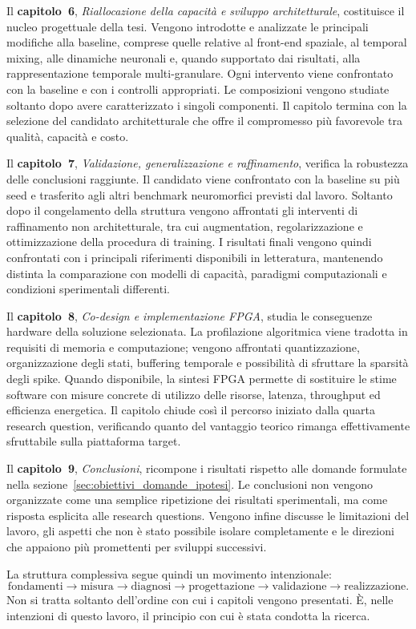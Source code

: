 Il \textbf{capitolo~6}, \emph{Riallocazione della capacità e sviluppo architetturale}, costituisce il nucleo progettuale della tesi. Vengono introdotte e analizzate le principali modifiche alla baseline, comprese quelle relative al front-end spaziale, al temporal mixing, alle dinamiche neuronali e, quando supportato dai risultati, alla rappresentazione temporale multi-granulare. Ogni intervento viene confrontato con la baseline e con i controlli appropriati. Le composizioni vengono studiate soltanto dopo avere caratterizzato i singoli componenti. Il capitolo termina con la selezione del candidato architetturale che offre il compromesso più favorevole tra qualità, capacità e costo.

Il \textbf{capitolo~7}, \emph{Validazione, generalizzazione e raffinamento}, verifica la robustezza delle conclusioni raggiunte. Il candidato viene confrontato con la baseline su più seed e trasferito agli altri benchmark neuromorfici previsti dal lavoro. Soltanto dopo il congelamento della struttura vengono affrontati gli interventi di raffinamento non architetturale, tra cui augmentation, regolarizzazione e ottimizzazione della procedura di training. I risultati finali vengono quindi confrontati con i principali riferimenti disponibili in letteratura, mantenendo distinta la comparazione con modelli di capacità, paradigmi computazionali e condizioni sperimentali differenti.

Il \textbf{capitolo~8}, \emph{Co-design e implementazione FPGA}, studia le conseguenze hardware della soluzione selezionata. La profilazione algoritmica viene tradotta in requisiti di memoria e computazione; vengono affrontati quantizzazione, organizzazione degli stati, buffering temporale e possibilità di sfruttare la sparsità degli spike. Quando disponibile, la sintesi FPGA permette di sostituire le stime software con misure concrete di utilizzo delle risorse, latenza, throughput ed efficienza energetica. Il capitolo chiude così il percorso iniziato dalla quarta research question, verificando quanto del vantaggio teorico rimanga effettivamente sfruttabile sulla piattaforma target.

Il \textbf{capitolo~9}, \emph{Conclusioni}, ricompone i risultati rispetto alle domande formulate nella sezione~\ref{sec:obiettivi_domande_ipotesi}. Le conclusioni non vengono organizzate come una semplice ripetizione dei risultati sperimentali, ma come risposta esplicita alle research questions. Vengono infine discusse le limitazioni del lavoro, gli aspetti che non è stato possibile isolare completamente e le direzioni che appaiono più promettenti per sviluppi successivi.

La struttura complessiva segue quindi un movimento intenzionale:
\begin{equation}
\label{eq:struttura_movimento}
\text{fondamenti} \rightarrow \text{misura} \rightarrow \text{diagnosi} \rightarrow \text{progettazione} \rightarrow \text{validazione} \rightarrow \text{realizzazione}.
\end{equation}
Non si tratta soltanto dell'ordine con cui i capitoli vengono presentati. È, nelle intenzioni di questo lavoro, il principio con cui è stata condotta la ricerca.